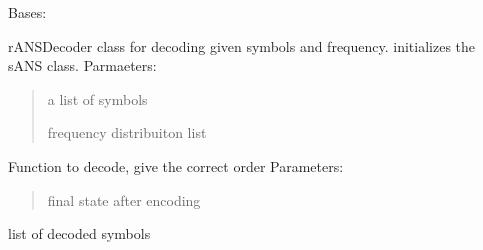 \documentclass[letterpaper,10pt,english]{sphinxmanual}
\begin{document}
\begin{fulllineitems}
\label{\detokenize{sANS:sANS.sANSDecoder}}
\pysigstartsignatures
{}
\pysigstopsignatures
\sphinxAtStartPar
Bases: {\hyperref[\detokenize{core:core.data.Data}]{}}

\sphinxAtStartPar
rANSDecoder class for decoding given symbols and frequency.
initializes the sANS class. 
Parmaeters:
\begin{quote}
\begin{description}
\sphinxAtStartPar
a list of symbols

\sphinxAtStartPar
frequency distribuiton list

\end{description}
\end{quote}

\begin{fulllineitems}
\label{\detokenize{sANS:sANS.sANSDecoder.decode}}
\pysigstartsignatures
{}
\pysigstopsignatures
\sphinxAtStartPar
Function to decode, give the correct order
Parameters:
\begin{quote}
\begin{description}
\sphinxAtStartPar
final state after encoding

\end{description}
\end{quote}
\begin{description}
\begin{description}
\sphinxAtStartPar
list of decoded symbols

\end{description}

\end{description}


\end{fulllineitems}
\end{fulllineitems}
\end{document}
